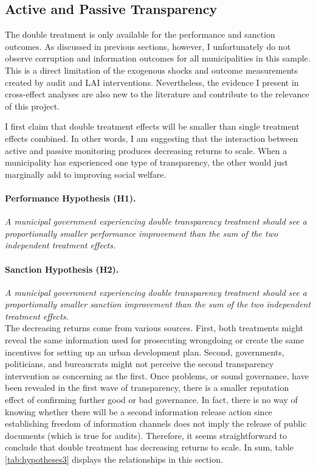 \documentclass[11pt]{article}
\begin{document}
\subsection{Active and Passive Transparency} \label{subsec:theory3_paper3}

The double treatment is only available for the performance and sanction outcomes. As discussed in previous sections, however, I unfortunately do not observe corruption and information outcomes for all municipalities in this sample. This is a direct limitation of the exogenous shocks and outcome measurements created by audit and LAI interventions. Nevertheless, the evidence I present in cross-effect analyses are also new to the literature and contribute to the relevance of this project.

I first claim that double treatment effects will be smaller than single treatment effects combined. In other words, I am suggesting that the interaction between active and passive monitoring produces decreasing returns to scale. When a municipality has experienced one type of transparency, the other would just marginally add to improving social welfare.

\paragraph{Performance Hypothesis (H1).} \emph{A municipal government experiencing double transparency treatment should see a proportionally smaller performance improvement than the sum of the two independent treatment effects.}

\paragraph{Sanction Hypothesis (H2).} \emph{A municipal government experiencing double transparency treatment should see a proportionally smaller sanction improvement than the sum of the two independent treatment effects.} \\

The decreasing returns come from various sources. First, both treatments might reveal the same information used for prosecuting wrongdoing or create the same incentives for setting up an urban development plan. Second, governments, politicians, and bureaucrats might not perceive the second transparency intervention as concerning as the first. Once problems, or sound governance, have been revealed in the first wave of transparency, there is a smaller reputation effect of confirming further good or bad governance. In fact, there is no way of knowing whether there will be a second information release action since establishing freedom of information channels does not imply the release of public documents (which is true for audits). Therefore, it seems straightforward to conclude that double treatment has decreasing returns to scale. In sum, table \ref{tab:hypotheses3} displays the relationships in this section.
\end{document}

